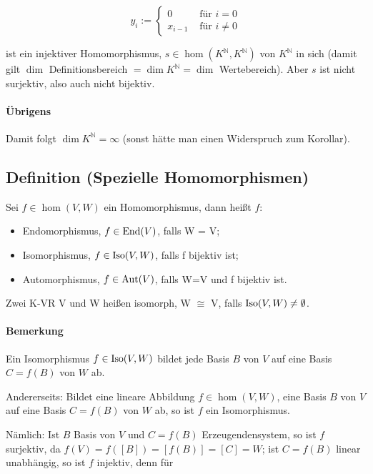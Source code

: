 	\begin{equation*}
		y_i :=
		\begin{cases}
			0 &\text{ für } i = 0\\
			x_{i-1} &\text{ für } i \neq 0
		\end{cases}
	\end{equation*}
			
	ist ein injektiver Homomorphismus, $s\in \hom(K^\mathbb{N},K^\mathbb{N})$ von $K^\mathbb{N}$ in sich (damit gilt $\dim $ Definitionsbereich $= \dim K^\mathbb{N}= \dim$ Wertebereich). Aber $s$ ist nicht surjektiv, also auch nicht bijektiv.
	
\paragraph{Übrigens}
	Damit folgt $\dim K^\mathbb{N} =\infty$ (sonst hätte man einen Widerspruch zum Korollar).
		
\subsection{Definition (Spezielle Homomorphismen)}
	\begin{Definition}
		Sei $f\in \hom(V,W)$ ein Homomorphismus, dann heißt $f$:
	\begin{itemize}
		\item Endomorphismus, $f\in \operatorname{End} (V)$, falls W = V;
		\item Isomorphismus, $f\in \operatorname{Iso}(V,W)$, falls f bijektiv ist;
		\item Automorphismus, $f\in \operatorname{Aut}(V)$, falls W=V und f bijektiv ist.
	\end{itemize}
	
	Zwei K-VR V und W heißen isomorph, W $\cong$ V, falls $\operatorname{Iso}(V,W) \neq \emptyset$.
	\end{Definition}

\paragraph{Bemerkung}
	Ein Isomorphismus $f\in \operatorname{Iso}(V,W)$ bildet jede Basis $B$ von $V$ auf eine Basis $C = f(B)$ von $W$ ab.
	
	Andererseits: Bildet eine lineare Abbildung $f\in \hom(V,W)$, eine Basis $B$ von $V$ auf eine Basis $C = f(B)$ von $W$ ab, so ist $f$ ein Isomorphismus.
	
	Nämlich: Ist $B$ Basis von $V$ und $ C = f(B)$ Erzeugendensystem, so ist $f$ surjektiv, da $f(V) = f ([B]) = [f(B)] = [C] = W$;
	ist $C =f(B)$ linear unabhängig, so ist $f$ injektiv, denn für
			
